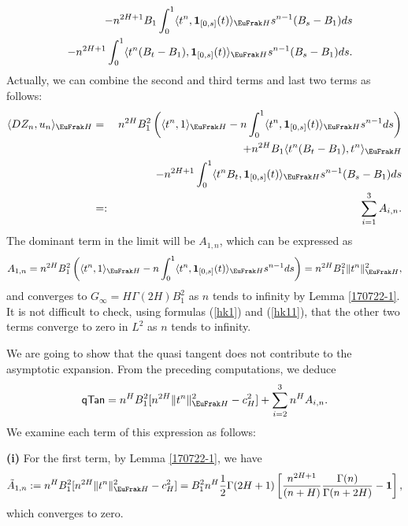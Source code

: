 \documentclass[a4paper]{article}
\numberwithin{equation}{section}
\def\HH{\EuFrak H}
\def\1{{\mathbf{1}}}
\def\1{{\mathbf{1}}}
\begin{document}
{\begin{eqnarray*}
      &&- n^{2H+1}B_1\int_0^1 \langle t^n   ,\mathbf{1}_{[0,s]}(t) \rangle_{\HH} s^{n-1}  (B_s-B_1) ds \\
         &&- n^{2H+1}\int_0^1 \langle t^n (B_t-B_1)  ,\mathbf{1}_{[0,s]}(t) \rangle_{\HH} s^{n-1}  (B_s-B_1) ds. \\
      \end{eqnarray*}
      Actually, we can combine the second and third terms   and last two terms as follows:
       \begin{eqnarray*}
   \langle DZ_n, u_n \rangle_{\HH} &=& 
   n^{2H}B_1^2 \left(  \langle t^n, 1 \rangle_{\HH} - n\int_0^1 \langle t^n ,\mathbf{1}_{[0,s]}(t) \rangle_{\HH} s^{n-1}  ds \right) \\
   &&+ n^{2H} B_1 \langle t^n(B_t-B_1), t^n \rangle_{\HH}  \\
      &&- n^{2H+1} \int_0^1 \langle t^n  B_t  ,\mathbf{1}_{[0,s]}(t) \rangle_{\HH} s^{n-1}  (B_s-B_1) ds \\
         &=:& \sum_{i=1} ^3 A_{i,n}.
      \end{eqnarray*}
          The dominant term in the  limit will be $A_{1,n}$, which can be expressed as
      \[
      A_{1,n}=  n^{2H}B_1^2 \left(  \langle t^n, 1 \rangle_{\HH} - n\int_0^1 \langle t^n ,\mathbf{1}_{[0,s]}(t) \rangle_{\HH} s^{n-1}  ds \right)
      = n^{2H} B_1^2 \| t^n \|_{\HH}^2,
      \]
  {\color {black} and} converges to $G_\infty=H \Gamma(2H) B_1^2$ as $n$ tends to infinity by Lemma \ref{170722-1}. It is not difficult to check, using formulas (\ref{hk1}) and (\ref{hk11}), that  the other two  terms converge to zero in  $L^2$  as $n$ tends to infinity.
  
  We are going to show that the quasi tangent  does not contribute to the asymptotic expansion.  From the preceding computations, we deduce 
  \[
  {\sf qTan} = n^H  B_1^2[ n^{2H}  \|t^n\|^2_{\HH} -  c_H^2] + \sum_{i=2} ^3 n^H A_{i,n}.
  \]
  We examine each term of this expression as follows:
  
  \medskip
  \noindent
  {\bf (i) }  For the first term,   by Lemma \ref{170722-1},  we have
  \[
\tilde{A}_{1,n}:= n^H  B_1^2[ n^{2H}  \|t^n\|^2_{\HH} -  c_H^2]  = B_1^2 n^H \frac 12 \Gamma(2H+1) \left[\frac {n^{2H+1}}{(n+H)}  \frac{ \Gamma(n) }{\Gamma(n+2H)} - \1  \right],
  \]
  which converges to zero.
  
}
\end{document}
